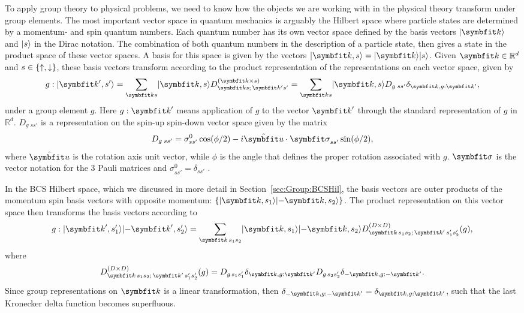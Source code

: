 To apply group theory to physical problems, we need to know how the objects we are working with in the physical theory transform under group elements.
The most important vector space in quantum mechanics is arguably the Hilbert space where particle states are determined by a momentum- and spin
quantum numbers. Each quantum number has its own vector space defined by the basis vectors $\ket{\v{k}}$ and $\lvert s \rangle$ in the Dirac notation. The
combination of both quantum numbers in the description of a particle state, then gives a state in the product space of these vector spaces.
A basis for this space is given by the vectors $\ket{\v{k},s} = \ket{\v{k}}\ket{s}$. Given $\v{k}\in\mathbb{R}^d$ and $s\in\{\uparrow,\downarrow\}$,
these basis vectors transform according to the product representation of the representations on each vector space, given by
\begin{equation}
    \label{eq:Group:App}
    g : \ket{\v{k}',s'} = \sum_{\v{k}s}\ket{\v{k},s}D^{(\v{k}\times s)}_{\v{k}s;\,\v{k}'s'} = \sum_{\v{k}s}\ket{\v{k},s}D_{g\;ss'}\delta_{\v{k},g:\v{k}'},
\end{equation}
under a group element $g$. Here $g:\v{k}'$ means application of $g$ to the vector $\v{k}'$ through the standard representation of $g$ in $\mathbb{R}^d$.
$D_{g\;ss'}$ is a representation on the spin-up spin-down vector space given by the matrix
\begin{equation}
    \label{eq:Group:Prod:spinRepMatrix}
    D_{g\;ss'} = \sigma^0_{ss'}\cos(\phi/2) - i\hat{\v{u}}\cdot\v{\sigma}_{ss'}\sin(\phi/2),
\end{equation}
where $\hat{\v{u}}$ is the rotation axis unit vector, while $\phi$ is the angle that defines the proper rotation associated with $g$. $\v{\sigma}$ is
the vector notation for the $3$ Pauli matrices and $\sigma^0_{ss'}=\delta_{ss'}$ \cite{Sergi04,Merzbacher99}.

In the BCS Hilbert space, which we discussed in more detail in Section~\ref{sec:Group:BCSHil},
the basis vectors are outer products of the momentum spin basis vectors with opposite momentum: $\{\ket{\v{k},s_1}\ket{-\v{k},s_2}\}$. The product
representation on this vector space then transforms the basis vectors according to
\begin{equation}
    \label{eq:Group:Prod:BCSProdRep}
    g:\ket{\v{k}',s_1'}\ket{-\v{k}',s_2'} = \sum_{\v{k}\,s_1s_2}\ket{\v{k},s_1}\ket{-\v{k},s_2}D^{(D\times D)}_{\v{k}\,s_1s_2;\,\v{k}'\,s_1's_2'}(g),
\end{equation}
where
\begin{equation}
    \label{eq:Group:Prod:BCSProdMatrix}
    D^{(D\times D)}_{\v{k}\,s_1s_2;\,\v{k}'\,s_1's_2'}(g) = D_{g\,s_1s_1'}\delta_{\v{k},g:\v{k}'}D_{g\,s_2s_2'}\delta_{-\v{k},g:-\v{k}'}.
\end{equation}
Since group representations on $\v{k}$ is a linear transformation, then $\delta_{-\v{k},g:-\v{k}'} = \delta_{\v{k},g:\v{k}'}$, such that the last
Kronecker delta function becomes superfluous.

